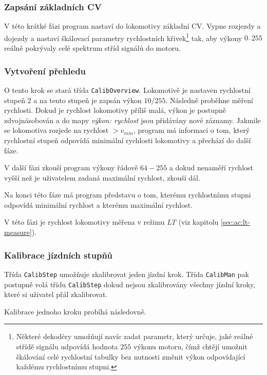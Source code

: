 \subsubsection{Zapsání základních CV}

V této krátké fázi program nastaví do lokomotivy základní CV. Vypne rozjezdy a
dojezdy a nastaví škálovací parametry rychlostních křivek\footnote{Některé
dekodéry umožňují navíc zadat parametr, který určuje, jaké reálné střídě
signálu udpovídá hodnota $255$ výkonu motoru, čímž chtějí umožnit
škálování celé rychlostní tabulky bez nutnosti změnit výkon odpovídající
každému rychlostnímu stupni.} tak, aby výkony $0$--$255$ reálně pokrývaly celé
spektrum stříd signálů do motoru.

\subsubsection{Vytvoření přehledu}

O tento krok se stará třída \texttt{CalibOverview}.
Lokomotivě je nastaven rychlostní stupeň $2$ a na tento stupeň je zapsán výkon
$10/255$. Následně proběhne měření rychlosti. Dokud je rychlost lokomotivy
příliš malá, výkon je postupně zdvojnásobován a do mapy \textit{výkon:
rychlost} jsou přidávány nové záznamy. Jakmile se lokomotiva rozjede na
rychlost $> v_{min}$, program má informaci o tom, který rychlostní stupeň
odpovídá minimální rychlosti lokomotivy a přechází do další fáze.

V další fázi zkouší program výkony řádově $64-255$ a dokud nenaměří rychlost
vyšší než je uživatelem zadaná maximální rychlost, zkouší dál.

Na konci této fáze má program představu o tom, kterému rychlostnímu stupni
odpovídá minimální rychlost a kterému maximální rychlost.

V této fázi je rychlost lokomotivy měřena v režimu \textit{LT} (viz kapitolu
\ref{sec:ac:lt-measure}).

\subsubsection{Kalibrace jízdních stupňů}

Třída \texttt{CalibStep} umožňuje zkalibrovat jeden jízdní krok. Třída
\texttt{CalibMan} pak postupně volá třídu \texttt{CalibStep} dokud nejsou
zkalibrovány všechny jízdní kroky, které si uživatel přál zkalibrovat.

Kalibrace jednoho kroku probíhá následovně.


